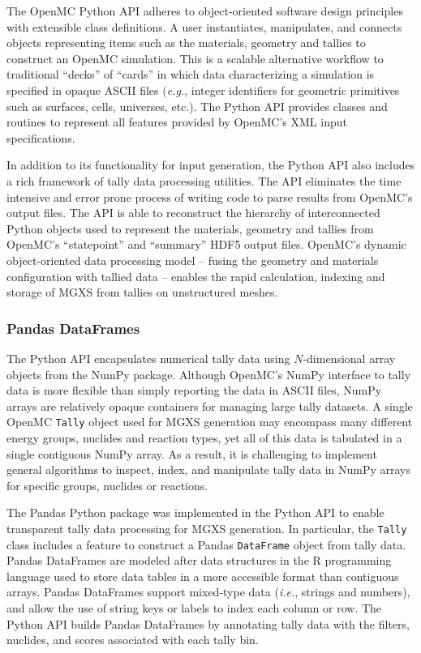 The OpenMC Python API adheres to object-oriented software design principles with extensible class definitions. A user instantiates, manipulates, and connects objects representing items such as the materials, geometry and tallies to construct an OpenMC simulation. This is a scalable alternative workflow to traditional ``decks'' of ``cards'' in which data characterizing a simulation is specified in opaque ASCII files (\textit{e.g.}, integer identifiers for geometric primitives such as surfaces, cells, universes, etc.). The Python API provides classes and routines to represent all features provided by OpenMC's XML input specifications.

In addition to its functionality for input generation, the Python API also includes a rich framework of tally data processing utilities. The API eliminates the time intensive and error prone process of writing code to parse results from OpenMC's output files. The API is able to reconstruct the hierarchy of interconnected Python objects used to represent the materials, geometry and tallies from OpenMC's ``statepoint'' and ``summary'' HDF5 output files\cite{koranne2011hdf5}. OpenMC's dynamic object-oriented data processing model -- fusing the geometry and materials configuration with tallied data -- enables the rapid calculation, indexing and storage of MGXS from tallies on unstructured meshes.

\subsubsection{Pandas DataFrames}
\label{subsubsec:chap4-pandas-df}

The Python API encapsulates numerical tally data using $N$-dimensional array objects from the NumPy package\cite{walt2011numpy}. Although OpenMC's NumPy interface to tally data is more flexible than simply reporting the data in ASCII files, NumPy arrays are relatively opaque containers for managing large tally datasets. A single OpenMC \texttt{Tally} object used for MGXS generation may encompass many different energy groups, nuclides and reaction types, yet all of this data is tabulated in a single contiguous NumPy array. As a result, it is challenging to implement general algorithms to inspect, index, and manipulate tally data in NumPy arrays for specific groups, nuclides or reactions.

The Pandas Python package\cite{mckinney2010pandas} was implemented in the Python API to enable transparent tally data processing for MGXS generation. In particular, the \texttt{Tally} class includes a feature to construct a Pandas \texttt{DataFrame} object from tally data. Pandas DataFrames are modeled after data structures in the \textsf{R} programming language used to store data tables in a more accessible format than contiguous arrays. Pandas DataFrames support mixed-type data (\textit{i.e.}, strings and numbers), and allow the use of string keys or labels to index each column or row. The Python API builds Pandas DataFrames by annotating tally data with the filters, nuclides, and scores associated with each tally bin. 

